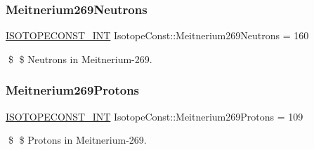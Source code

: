 \subsubsection{\texorpdfstring{Meitnerium269\+Neutrons}{Meitnerium269Neutrons}}
{\footnotesize\ttfamily \mbox{\hyperlink{group___isotope_const-_macros_ga5f18360b3e99483a35c32d789e62621c}{I\+S\+O\+T\+O\+P\+E\+C\+O\+N\+S\+T\+\_\+\+I\+NT}} Isotope\+Const\+::\+Meitnerium269\+Neutrons = 160}

\$ \$ Neutrons in Meitnerium-\/269. \mbox{\label{group___isotope_const-_meitnerium-_mt269_ga72f389b2665c8d1eda98ed57eb62b374}} 
\subsubsection{\texorpdfstring{Meitnerium269\+Protons}{Meitnerium269Protons}}
{\footnotesize\ttfamily \mbox{\hyperlink{group___isotope_const-_macros_ga5f18360b3e99483a35c32d789e62621c}{I\+S\+O\+T\+O\+P\+E\+C\+O\+N\+S\+T\+\_\+\+I\+NT}} Isotope\+Const\+::\+Meitnerium269\+Protons = 109}

\$ \$ Protons in Meitnerium-\/269. 